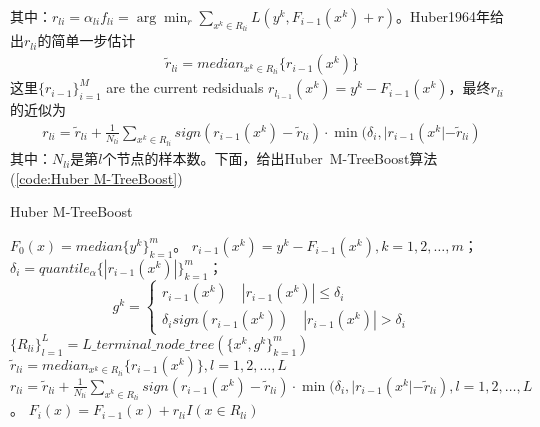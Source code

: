               其中：$r_{li} = \alpha_{li}f_{li} = \arg\min_r\sum_{x^k\in R_{li}}L(y^k,F_{i-1}(x^k)+r)  $。Huber1964年给出$r_{li}$的简单一步估计
              \begin{align*}
              \tilde{r}_{li} = median_{x^k\in R_{li}} \{r_{{i-1}}(x^k)\}
              \end{align*}
              这里$\{r_{i-1}\}_{i=1}^M$ are the current redsiduals $r_{l_{i-1}}(x^k) = y^k - F_{i-1}(x^k)$，最终$r_{li}$的近似为
              \begin{align*}
              r_{li} = \tilde{r}_{li} + \frac{1}{N_{li}} \sum_{x^k\in R_{li}}sign (r_{i-1}(x^k) - \tilde{r}_{li})\cdot \min(\delta_i,|r_{i-1}(x^k| - \tilde{r}_{li})
              \end{align*}
              其中：$N_{li}$是第$l$个节点的样本数。下面，给出Huber\ M-TreeBoost算法(\ref{code:Huber M-TreeBoost})
              \begin{algorithm}[H]
                  \caption{Huber M-TreeBoost}\label{code:Huber M-TreeBoost}
                  \begin{algorithmic}[1]
                      \State $F_0(x) = median\{y^k\}_{k=1}^m$。
                          \State $r_{i-1}(x^k) = y^k - F_{i-1}(x^k),k=1,2,\dots,m$；
                          \State $\delta_i = quantile_\alpha\{|r_{i-1}(x^k)|\}_{k=1}^m$；
                          \State \[ g^k = \left\{
                          \begin{aligned}
                          r_{i-1}(x^k) \quad |r_{i-1}(x^k)| \leqslant \delta_i\\
                          \delta_isign(r_{i-1}(x^k))\quad |r_{i-1}(x^k)|>\delta_i
                          \end{aligned}
                          \right. \]
                          \State $\{R_{li}\}_{l=1}^L = L\_terminal\_node\_tree(\{x^k,g^k\}_{k=1}^m)$
                          \State $\tilde{r}_{li} = median_{x^k\in R_{li}} \{r_{{i-1}}(x^k)\} ,l=1,2,\dots,L$
                          \State $r_{li} = \tilde{r}_{li} + \frac{1}{N_{li}} \sum\limits_{x^k\in R_{li}}sign (r_{i-1}(x^k) - \tilde{r}_{li})\cdot \min(\delta_i,|r_{i-1}(x^k| - \tilde{r}_{li}),l = 1,2,\dots,L$ 。
                          \State $F_i(x) = F_{i-1}(x) + r_{li}I(x\in R_{li})$
                      \EndFor
                  \end{algorithmic}
              \end{algorithm}

